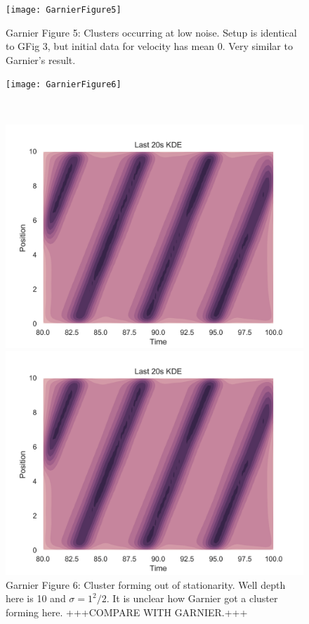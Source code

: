 \documentclass[11pt,a4paper, dvipsnames]{article}
\begin{document}
\begin{figure}
    \centering
    \texttt{[image: GarnierFigure5]}
    \caption{Garnier Figure 5: Clusters occurring at low noise. Setup is identical to GFig 3, but initial data for velocity has mean 0. Very similar to Garnier's result.}
    \end{figure}
    
    \begin{figure}
    \centering
    \begin{minipage}[b]{\textwidth}
        \centering
        
        \texttt{[image: GarnierFigure6]}
    \end{minipage} \\
    
    \begin{minipage}[b]{0.49\textwidth}
        \centering
        \includegraphics[width=\textwidth]{GarnierFigure6b}
    \end{minipage} %
    \begin{minipage}[b]{0.49\textwidth}
        \centering                    
        \includegraphics[width=\textwidth]{GarnierFigure6d}
    \end{minipage}
    \caption{Garnier Figure 6: Cluster forming out of stationarity. Well depth here is 10 and $\sigma = 1^2/2$. It is unclear how Garnier got a cluster forming here. +++COMPARE WITH GARNIER.+++}
\end{figure}
\end{document}
